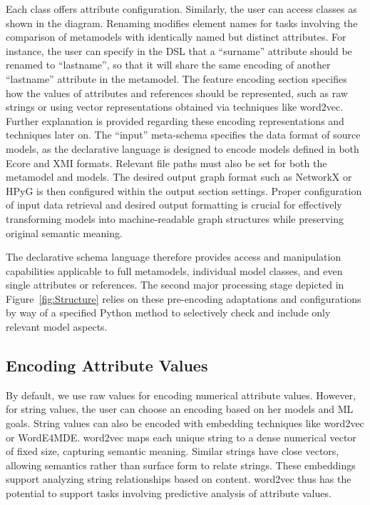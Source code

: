 \documentclass[journal,article,submit,moreauthors,technologies]{Definitions/mdpi}
\begin{document}
Each class offers attribute configuration. Similarly, the user can access classes as shown in the diagram. Renaming modifies element names for tasks involving the comparison of metamodels with identically named but distinct attributes. For instance, the user can specify in the DSL that a ``surname'' attribute should be renamed to ``lastname'', so that it will share the same encoding of another ``lastname'' attribute in the metamodel.
The feature encoding section specifies how the values of attributes and references should be represented, such as raw strings or using vector representations obtained via techniques like word2vec. Further explanation is provided regarding these encoding representations and techniques later on. The ``input'' meta-schema specifies the data format of source models, as the declarative language is designed to encode models defined in both Ecore and XMI formats. Relevant file paths must also be set for both the metamodel and models. The desired output graph format such as NetworkX or HPyG is then configured within the output section settings. Proper configuration of input data retrieval and desired output formatting is crucial for effectively transforming models into machine-readable graph structures while preserving original semantic meaning.

The declarative schema language therefore provides access and manipulation capabilities applicable to full metamodels, individual model classes, and even single attributes or references. The second major processing stage depicted in Figure~\ref{fig:Structure} relies on these pre-encoding adaptations and configurations by way of a specified Python method to selectively check and include only relevant model aspects.

\subsection{Encoding Attribute Values}\label{sec:avalues}
By default, we use raw values for encoding numerical attribute values. However, for string values, the user can choose an encoding based on her models and ML goals. String values can also be encoded with embedding techniques like word2vec or WordE4MDE. word2vec maps each unique string to a dense numerical vector of fixed size, capturing semantic meaning. Similar strings have close vectors, allowing semantics rather than surface form to relate strings. These embeddings support analyzing string relationships based on content. word2vec thus has the potential to support tasks involving predictive analysis of attribute values.
\end{document}
